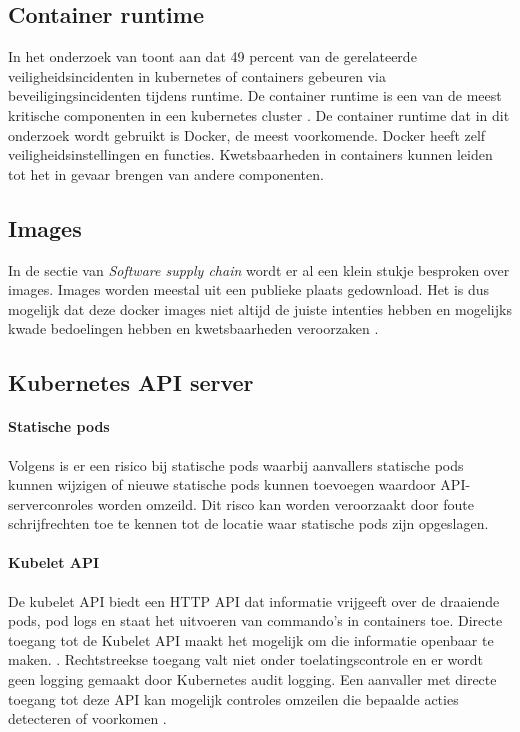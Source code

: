 \subsection{Container runtime}
In het onderzoek van \textcite{red-hat-2023} toont aan dat 49 percent van de gerelateerde veiligheidsincidenten in kubernetes of containers gebeuren via beveiligingsincidenten tijdens runtime. De container runtime is een van de meest kritische componenten in een kubernetes cluster \autocite{mytilinakis2020attack}. De container runtime dat in dit onderzoek wordt gebruikt is Docker, de meest voorkomende. Docker heeft zelf veiligheidsinstellingen en functies. Kwetsbaarheden in containers kunnen leiden tot het in gevaar brengen van andere componenten. 

\subsection{Images}
In de sectie van \textit{Software supply chain} wordt er al een klein stukje besproken over images. Images worden meestal uit een publieke plaats gedownload. Het is dus mogelijk dat deze docker images niet altijd de juiste intenties hebben en mogelijks kwade bedoelingen hebben en kwetsbaarheden veroorzaken \autocite{mytilinakis2020attack}. 

\subsection{Kubernetes API server}
\paragraph{Statische pods}
Volgens \textcite{KubernetesDocs-2023} is er een risico bij statische pods waarbij aanvallers statische pods kunnen wijzigen of nieuwe statische pods kunnen toevoegen waardoor API-serverconroles worden omzeild. 
Dit risco kan worden veroorzaakt door foute schrijfrechten toe te kennen tot de locatie waar statische pods zijn opgeslagen.

\paragraph{Kubelet API}
De kubelet API biedt een HTTP API dat informatie vrijgeeft over de draaiende pods, pod logs en staat het uitvoeren van commando's in containers toe.
Directe toegang tot de Kubelet API maakt het mogelijk om die informatie openbaar te maken. \autocite{KubernetesDocs-2023}.
Rechtstreekse toegang valt niet onder toelatingscontrole en er wordt geen logging gemaakt door Kubernetes audit logging. Een aanvaller met directe toegang tot deze API kan mogelijk controles omzeilen die bepaalde acties detecteren of voorkomen \autocite{KubernetesDocs-2023}.


